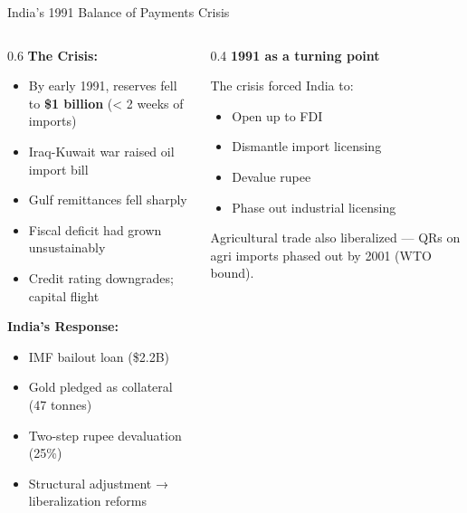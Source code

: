 \documentclass[
  ignorenonframetext,
  aspectratio=169,
]{beamer}
\makeatletter
\providecommand{\tightlist}{%
  \setlength{\itemsep}{0pt}\setlength{\parskip}{0pt}}
\let\quarto@originallabel\label
\DeclareRobustCommand*{\label}[1]{\quarto@originallabel{#1}}
\makeatother
\begin{document}
\begin{frame}{India's 1991 Balance of Payments Crisis}
\label{indias-1991-balance-of-payments-crisis}
\begin{columns}[T]
\begin{column}{0.6\linewidth}
\textbf{The Crisis:}

\begin{itemize}
\tightlist
\item
  By early 1991, reserves fell to \textbf{\$1 billion} (\textless{} 2
  weeks of imports)
\item
  Iraq-Kuwait war raised oil import bill
\item
  Gulf remittances fell sharply
\item
  Fiscal deficit had grown unsustainably
\item
  Credit rating downgrades; capital flight
\end{itemize}

\textbf{India's Response:}

\begin{itemize}
\tightlist
\item
  IMF bailout loan (\$2.2B)
\item
  Gold pledged as collateral (47 tonnes)
\item
  Two-step rupee devaluation (25\%)
\item
  Structural adjustment → liberalization reforms
\end{itemize}
\end{column}

\begin{column}{0.4\linewidth}
\textbf{1991 as a turning point}

The crisis forced India to:

\begin{itemize}
\tightlist
\item
  Open up to FDI
\item
  Dismantle import licensing
\item
  Devalue rupee
\item
  Phase out industrial licensing
\end{itemize}

Agricultural trade also liberalized --- QRs on agri imports phased out
by 2001 (WTO bound).
\end{column}
\end{columns}
\end{frame}
\end{document}
